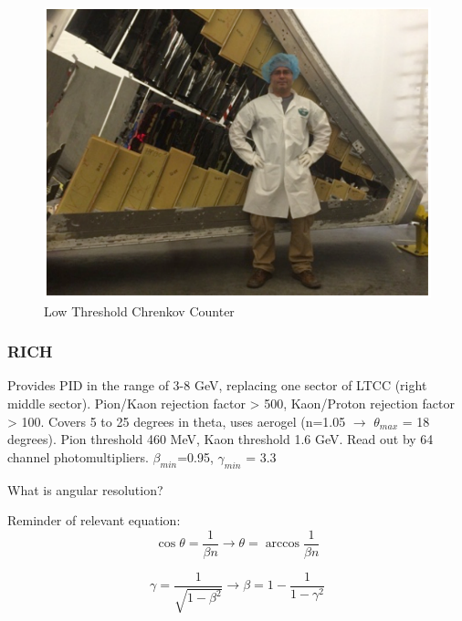             
						
									
			 \begin{figure}[H]
    			\centering
    			\includegraphics[width=12cm]{Chapters/Ch2-Experiment/clas-12-exp/clas-detectors/fd/pics/ltcc.png}
    			\caption{Low Threshold Chrenkov Counter}
			\end{figure}
			
			

			
        \subsubsection{RICH}
            Provides PID in the range of 3-8 GeV, replacing one sector of LTCC (right middle sector). Pion/Kaon rejection factor > 500, Kaon/Proton rejection factor > 100. Covers 5 to 25 degrees in theta, uses aerogel (n=1.05 $\longrightarrow$ $\theta_{max}$ = 18 degrees). Pion threshold 460 MeV, Kaon threshold 1.6 GeV. Read out by 64 channel photomultipliers. $\beta_{min}$=0.95, $\gamma_{min}$ = 3.3
            
            What is angular resolution?
            
            Reminder of relevant equation:
            \begin{equation}
                \cos{\theta} = \frac{1}{\beta n} \longrightarrow \theta = \arccos{\frac{1}{\beta n}}
            \end{equation}
            
            \begin{equation}
                \gamma = \frac{1}{\sqrt{1-\beta^2}} \longrightarrow \beta = 1-\frac{1}{1-\gamma^2} 
            \end{equation}
            
